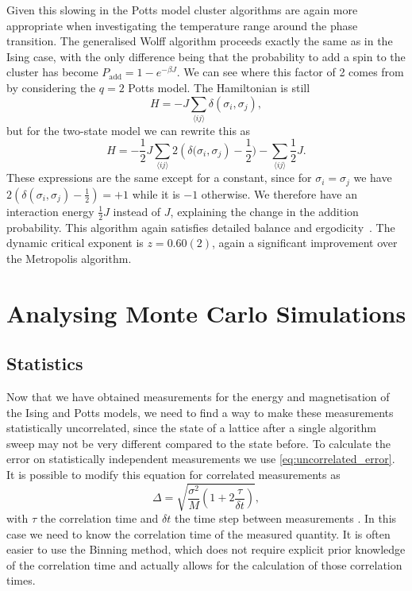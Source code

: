 \documentclass[11pt, a4paper]{report} %
\begin{document}
Given this slowing in the Potts model cluster algorithms are again more appropriate when investigating the temperature range around the phase transition.
The generalised Wolff algorithm proceeds exactly the same as in the Ising case, with the only difference being that the probability to add a spin to the cluster has become \(P_{\mathrm{add}} = 1 - e^{-\beta J}\).
We can see where this factor of 2 comes from by considering the \(q=2\) Potts model.
The Hamiltonian is still
\begin{equation}
	H = -J\sum_{\langle i j \rangle} \delta(\sigma_i, \sigma_j),
\end{equation}
but for the two-state model we can rewrite this as
\begin{equation}
	H = -\frac{1}{2} J \sum_{\langle i j \rangle} 2 \left(\delta(\sigma_i, \sigma_j\right) - \frac{1}{2}) - \sum_{\langle i j \rangle} \frac{1}{2}J.
\end{equation}
These expressions are the same except for a constant, since for \(\sigma_i = \sigma_j\) we have \(2 (\delta(\sigma_i, \sigma_j) - \frac{1}{2}) = +1\) while it is \(-1\) otherwise.
We therefore have an interaction energy \(\frac{1}{2}J\) instead of \(J\), explaining the change in the addition probability.
This algorithm again satisfies detailed balance and ergodicity~\cite{newman:1999}.
The dynamic critical exponent is \(z=0.60(2)\), again a significant improvement over the Metropolis algorithm.




\chapter{Analysing Monte Carlo Simulations}
\section{Statistics}\label{sec:statistics}
Now that we have obtained measurements for the energy and magnetisation of the Ising and Potts models, we need to find a way to make these measurements statistically uncorrelated, since the state of a lattice after a single algorithm sweep may not be very different compared to the state before.
To calculate the error on statistically independent measurements we use \cref{eq:uncorrelated_error}.
It is possible to modify this equation for correlated measurements as
\begin{equation}
	\Delta = \sqrt{\frac{\sigma^2}{M}\left(1+2\frac{\tau}{\delta t}\right)},
\end{equation}
with \(\tau\) the correlation time and \(\delta t\) the time step between measurements \cite{landau:2015}.
In this case we need to know the correlation time of the measured quantity.
It is often easier to use the Binning method, which does not require explicit prior knowledge of the correlation time and actually allows for the calculation of those correlation times.
\end{document}
